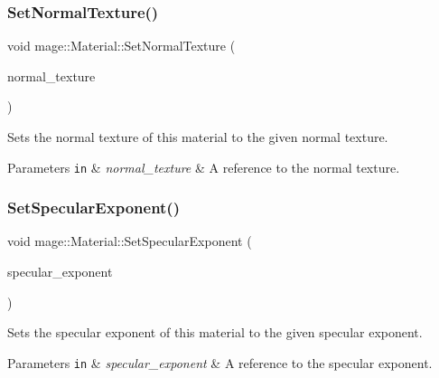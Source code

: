 \subsubsection{\texorpdfstring{Set\+Normal\+Texture()}{SetNormalTexture()}}
{\footnotesize\ttfamily void mage\+::\+Material\+::\+Set\+Normal\+Texture (\begin{DoxyParamCaption}\item[{\hyperlink{namespacemage_a1e01ae66713838a7a67d30e44c67703e}{Shared\+Ptr}$<$ \hyperlink{classmage_1_1_texture}{Texture} $>$}]{normal\+\_\+texture }\end{DoxyParamCaption})}

Sets the normal texture of this material to the given normal texture.


\begin{DoxyParams}[1]{Parameters}
\mbox{\tt in}  & {\em normal\+\_\+texture} & A reference to the normal texture. \\
\hline
\end{DoxyParams}
\hypertarget{structmage_1_1_material_a078a2c9388993523e29f287e20385b3f}{}\label{structmage_1_1_material_a078a2c9388993523e29f287e20385b3f} 
\subsubsection{\texorpdfstring{Set\+Specular\+Exponent()}{SetSpecularExponent()}}
{\footnotesize\ttfamily void mage\+::\+Material\+::\+Set\+Specular\+Exponent (\begin{DoxyParamCaption}\item[{float}]{specular\+\_\+exponent }\end{DoxyParamCaption})\hspace{0.3cm}{\ttfamily [noexcept]}}

Sets the specular exponent of this material to the given specular exponent.


\begin{DoxyParams}[1]{Parameters}
\mbox{\tt in}  & {\em specular\+\_\+exponent} & A reference to the specular exponent. \\
\hline
\end{DoxyParams}
\hypertarget{structmage_1_1_material_ae07cb5f8c3b4ee0d6e6f4f91c1cbbf35}{}\label{structmage_1_1_material_ae07cb5f8c3b4ee0d6e6f4f91c1cbbf35} 
